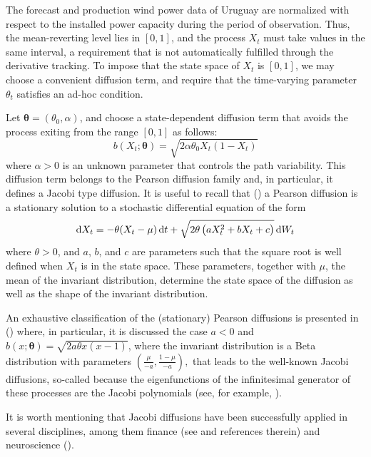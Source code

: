 \documentclass[11pt]{article}
\theoremstyle{definition}
\begin{document}
The forecast and production wind power data of Uruguay are normalized with respect to the installed power capacity during the period of observation. Thus, the mean-reverting level lies in $[0,1]$, and the process $X_t$  must take values in the same interval, a requirement that is not automatically fulfilled through the derivative tracking. To impose that the state space of $X_t$ is $[0,1]$, we may choose a convenient diffusion term, and require that the time-varying parameter $ \theta_t$ satisfies an ad-hoc condition.
 
Let $\bm{\theta} = (\theta_0,\alpha)$, and choose a state-dependent diffusion term that avoids the process exiting from the range $[0,1]$ as follows:
  \begin{equation}
    b (X_t; \bm{\theta} )= \sqrt{2 \alpha \theta_0 X_t (1 - X_t)}
  \end{equation}
  where $\alpha >0$ is an unknown parameter that controls the path variability. This diffusion term belongs to the Pearson diffusion family and, in particular, it defines a Jacobi type diffusion. It is useful to recall that (\cite[440]{foso}) a Pearson diffusion is a stationary solution to a stochastic differential equation of the form \begin{equation}
    \dif X_t = - \theta (X_t - \mu)\dif t + \sqrt{2 \theta \left(a X_t^2 + b X_t + c\right)} \dif W_t
  \end{equation}
where $\theta>0$, and $a$, $b$, and $c$ are parameters such that the square root is well defined when $X_t$ is in the state space. These parameters, together with $\mu$, the mean of the invariant distribution, determine the state space of the diffusion as well as the shape of the invariant distribution.

An exhaustive classification of the (stationary) Pearson diffusions is presented in (\cite[440-443]{foso}) where, in particular, it is discussed the case $a < 0$ and $b(x; \bm{\theta}) = \sqrt{2 a \theta x (x-1)}$, where the invariant distribution is a Beta distribution with parameters $\left( \frac{\mu}{-a}, \frac{1 - \mu}{-a} \right),$ that leads to the well-known Jacobi diffusions, so-called because the eigenfunctions of the infinitesimal generator of these processes are the Jacobi polynomials (see, for example, \cite[2860-2861]{leph}). 

It is worth mentioning that Jacobi diffusions have been successfully applied in several disciplines, among them finance (see \cite{vago} and references therein) and neuroscience (\cite{dotala}).
\end{document}
